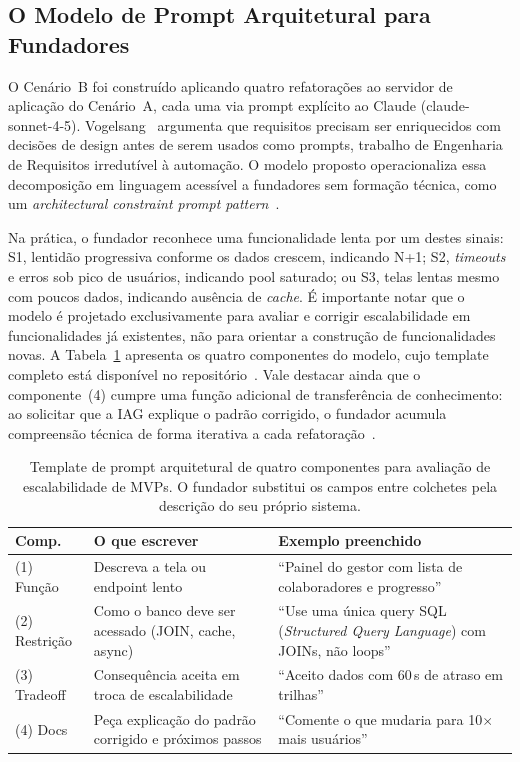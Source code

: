 \documentclass[sigconf]{acmart}
\begin{document}
\subsection{O Modelo de Prompt Arquitetural para Fundadores}
\label{subsec:modelo_prompt}

O Cenário~B foi construído aplicando quatro refatorações ao servidor de aplicação do Cenário~A,
cada uma via prompt explícito ao Claude (claude-sonnet-4-5). Vogelsang~\cite{Vogelsang2024}
argumenta que requisitos precisam ser enriquecidos com decisões de design antes de
serem usados como prompts, trabalho de Engenharia de Requisitos irredutível à
automação. O modelo proposto operacionaliza essa decomposição em linguagem acessível
a fundadores sem formação técnica, como um \textit{architectural constraint prompt
pattern}~\cite{White2023}.

Na prática, o fundador reconhece uma funcionalidade lenta por um destes sinais: S1, lentidão progressiva conforme os dados crescem, indicando N+1; S2, \textit{timeouts} e erros sob pico de usuários, indicando pool saturado; ou S3, telas lentas mesmo com poucos dados, indicando ausência de \textit{cache}. É importante notar que o modelo é projetado exclusivamente para avaliar e corrigir escalabilidade em funcionalidades já existentes, não para orientar a construção de funcionalidades novas. A Tabela~\ref{tab:modelo_prompt} apresenta os quatro componentes do modelo, cujo template completo está disponível no repositório~\cite{GenAIDebt2026}. Vale destacar ainda que o componente~(4) cumpre uma função adicional de transferência de conhecimento: ao solicitar que a IAG explique o padrão corrigido, o fundador acumula compreensão técnica de forma iterativa a cada refatoração~\cite{Vogelsang2024}.

\begin{table}[t]
  \caption{Template de prompt arquitetural de quatro componentes para avaliação
           de escalabilidade de MVPs. O fundador substitui os campos entre colchetes
           pela descrição do seu próprio sistema.}
  \label{tab:modelo_prompt}
  \small
  \begin{tabular}{p{1.0cm}p{2.5cm}p{2.8cm}}
    \toprule
    \textbf{Comp.} & \textbf{O que escrever} & \textbf{Exemplo preenchido} \\
    \midrule
    (1) Função & Descreva a tela ou endpoint lento & ``Painel do gestor com lista de colaboradores e progresso'' \\
    (2) Restrição & Como o banco deve ser acessado (JOIN, cache, async) & ``Use uma única query SQL (\textit{Structured Query Language}) com JOINs, não loops'' \\
    (3) Tradeoff & Consequência aceita em troca de escalabilidade & ``Aceito dados com 60\,s de atraso em trilhas'' \\
    (4) Docs & Peça explicação do padrão corrigido e próximos passos & ``Comente o que mudaria para 10$\times$ mais usuários'' \\
    \bottomrule
  \end{tabular}
\end{table}
\end{document}
